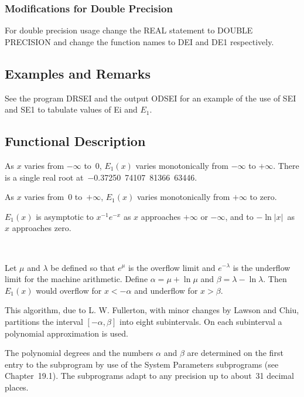 \documentclass[twoside]{MATH77}
\begin{document}
\subsubsection{Modifications for Double Precision}

For double precision usage change the REAL statement to DOUBLE PRECISION and
change the function names to DEI and DE1 respectively.

\subsection{Examples and Remarks}

See the program DRSEI and the output ODSEI for an example of the use of SEI
and SE1 to tabulate values of Ei and $E_1.$

\subsection{Functional Description}

As $x$ varies from $-\infty $ to~0, $E_1(x)$ varies monotonically from $%
-\infty $ to $+\infty $. There is a single real root
at~$-$0.37250~74107~81366~63446.

As $x$ varies from~0 to~$+\infty $, $E_1(x)$ varies monotonically from $%
+\infty $ to zero.

$E_1(x)$ is asymptotic to $x^{-1}e^{-x}$ as $x$ approaches $+\infty $ or $%
-\infty $, and to $-\ln |x|$\ as $x$ approaches zero.
\vspace{10pt}

\hspace{5pt}\mbox{ }

Let $\mu $ and $\lambda $ be defined so that $e^\mu $ is the overflow limit
and $e^{-\lambda }$ is the underflow limit for the machine arithmetic.
Define $\alpha = \mu + \ln \mu $ and $\beta = \lambda - \ln \lambda $. Then $%
E_1(x)$ would overflow for $x < -\alpha $ and underflow for $x > \beta .$

This algorithm, due to L. W. Fullerton, with minor changes by Lawson and
Chiu, partitions the interval $[-\alpha ,\beta ]$ into eight subintervals.
On each subinterval a polynomial approximation is used.

The polynomial degrees and the numbers $\alpha $ and $\beta $ are determined
on the first entry to the subprogram by use of the System Parameters
subprograms (see Chapter~19.1). The subprograms adapt to any precision up to
about~31 decimal places.
\end{document}
